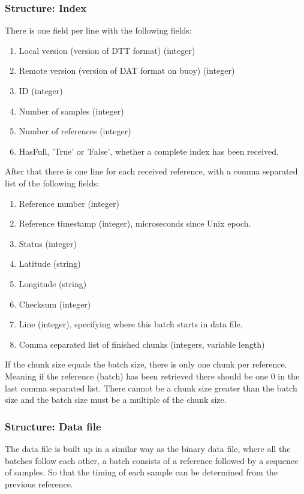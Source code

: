 \documentclass[a4paper]{article}
\begin{document}
\begin{multicols}{2}
  \subsubsection{Structure: Index}
  There is one field per line with the following fields: \\
  \begin{enumerate}
    \item Local version (version of DTT format) (integer)
    \item Remote version (version of DAT format on buoy) (integer)
    \item ID (integer)
    \item Number of samples (integer)
    \item Number of references (integer)
    \item HasFull, 'True' or 'False', whether a complete index has been
      received.
  \end{enumerate}

  After that there is one line for each received reference, with a comma
  separated list of the following fields: \\
  \begin{enumerate}
    \item Reference number (integer)
    \item Reference timestamp (integer), microseconds since Unix epoch.
    \item Status (integer)
    \item Latitude  (string)
    \item Longitude (string)
    \item Checksum (integer)
    \item Line (integer), specifying where this batch starts in data file.
    \item Comma separated list of finished chunks (integers, variable
      length)
  \end{enumerate}

  If the chunk size equals the batch size, there is only one chunk per
  reference. Meaning if the reference (batch) has been retrieved there
  should be one 0 in the last comma separated list. There cannot be a
  chunk size greater than the batch size and the batch size must be a
  multiple of the chunk size.

  \subsubsection{Structure: Data file}
  The data file is built up in a similar way as the binary data file,
  where all the batches follow each other, a batch consists of a
  reference followed by a sequence of samples. So that the timing of
  each sample can be determined from the previous reference.


\end{multicols}
\end{document}
